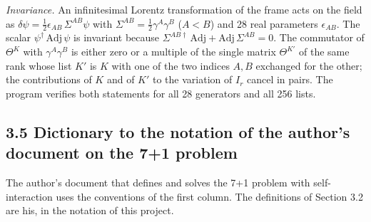\documentclass[
  10pt,
]{article}
\begin{document}
\emph{Invariance.} An infinitesimal Lorentz transformation of the frame
acts on the field as
\(\delta\psi=\tfrac12\epsilon_{AB}\,\Sigma^{AB}\psi\) with
\(\Sigma^{AB}=\tfrac12\gamma^A\gamma^B\) (\(A<B\)) and 28 real
parameters \(\epsilon_{AB}\). The scalar
\(\psi^\dagger\,\mathrm{Adj}\,\psi\) is invariant because
\(\Sigma^{AB\dagger}\,\mathrm{Adj}+\mathrm{Adj}\,\Sigma^{AB}=0\). The
commutator of \(\Theta^K\) with \(\gamma^A\gamma^B\) is either zero or a
multiple of the single matrix \(\Theta^{K'}\) of the same rank whose
list \(K'\) is \(K\) with one of the two indices \(A,B\) exchanged for
the other; the contributions of \(K\) and of \(K'\) to the variation of
\(I_r\) cancel in pairs. The program verifies both statements for all 28
generators and all 256 lists.

\hypertarget{dictionary-to-the-notation-of-the-authors-document-on-the-71-problem}{%
\subsection{3.5 Dictionary to the notation of the author's document on
the 7+1
problem}\label{dictionary-to-the-notation-of-the-authors-document-on-the-71-problem}}

The author's document that defines and solves the 7+1 problem with
self-interaction uses the conventions of the first column. The
definitions of Section 3.2 are his, in the notation of this project.
\end{document}
